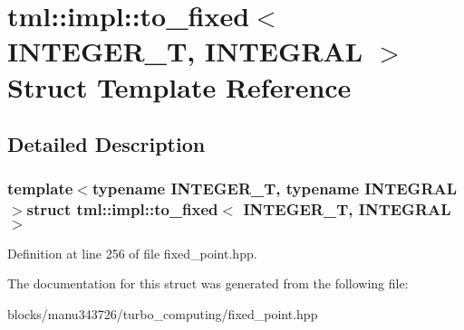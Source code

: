 \hypertarget{structtml_1_1impl_1_1to__fixed}{\section{tml\+:\+:impl\+:\+:to\+\_\+fixed$<$ I\+N\+T\+E\+G\+E\+R\+\_\+\+T, I\+N\+T\+E\+G\+R\+A\+L $>$ Struct Template Reference}
\label{structtml_1_1impl_1_1to__fixed}
}


\subsection{Detailed Description}
\subsubsection*{template$<$typename I\+N\+T\+E\+G\+E\+R\+\_\+\+T, typename I\+N\+T\+E\+G\+R\+A\+L$>$struct tml\+::impl\+::to\+\_\+fixed$<$ I\+N\+T\+E\+G\+E\+R\+\_\+\+T, I\+N\+T\+E\+G\+R\+A\+L $>$}



Definition at line 256 of file fixed\+\_\+point.\+hpp.



The documentation for this struct was generated from the following file\+:\begin{DoxyCompactItemize}
\item 
blocks/manu343726/turbo\+\_\+computing/fixed\+\_\+point.\+hpp\end{DoxyCompactItemize}
